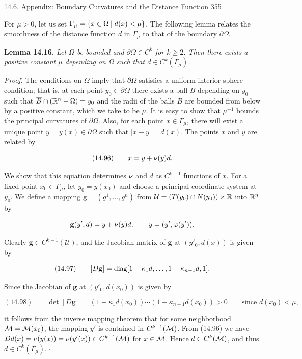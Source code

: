 
14.6. Appendix: Boundary Curvatures and the Distance Function \hfill 355

For $\mu>0$, let us set $\Gamma_{\mu}=\{x\in\Omega\mid d(x)<\mu\}$. The following lemma relates the smoothness of the distance function $d$ in $\Gamma_{\mu}$ to that of the boundary $\partial\Omega$.

\begin{lemma}\label{gt14-boundary-gradient-14-16}
\textbf{Lemma 14.16.} \textit{Let $\Omega$ be bounded and $\partial\Omega\in C^k$ for $k\ge 2$. Then there exists a positive constant $\mu$ depending on $\Omega$ such that $d\in C^k(\Gamma_{\mu})$.}

\textit{Proof.} The conditions on $\Omega$ imply that $\partial\Omega$ satisfies a uniform interior sphere condition; that is, at each point $y_0\in\partial\Omega$ there exists a ball $B$ depending on $y_0$ such that $\overline{B}\cap(\mathbb{R}^n-\Omega)=y_0$ and the radii of the balls $B$ are bounded from below by a positive constant, which we take to be $\mu$. It is easy to show that $\mu^{-1}$ bounds the principal curvatures of $\partial\Omega$. Also, for each point $x\in\Gamma_{\mu}$, there will exist a unique point $y=y(x)\in\partial\Omega$ such that $|x-y|=d(x)$. The points $x$ and $y$ are related by

\begin{equation}
(14.96)\qquad x=y+\nu(y)d.
\end{equation}

We show that this equation determines $\nu$ and $d$ as $C^{k-1}$ functions of $x$. For a fixed point $x_0\in\Gamma_{\mu}$, let $y_0=y(x_0)$ and choose a principal coordinate system at $y_0$. We define a mapping $\mathbf{g}=(g^1,\dots,g^n)$ from $\mathcal U=(T(y_0)\cap N(y_0))\times\mathbb{R}$ into $\mathbb{R}^n$ by

\[
\mathbf{g}(y',d)=y+\nu(y)d,\qquad y=(y',\varphi(y')).
\]

Clearly $\mathbf{g}\in C^{k-1}(\mathcal U)$, and the Jacobian matrix of $\mathbf{g}$ at $(y'_0,d(x))$ is given by

\begin{equation}
(14.97)\qquad [D\mathbf{g}]=\operatorname{diag}[1-\kappa_1 d,\dots,1-\kappa_{n-1}d,1].
\end{equation}

Since the Jacobian of $\mathbf{g}$ at $(y'_0,d(x_0))$ is given by

\begin{equation}
(14.98)\qquad \det [D\mathbf{g}]=(1-\kappa_1 d(x_0))\cdots(1-\kappa_{n-1} d(x_0))>0\qquad \text{since } d(x_0)<\mu,
\end{equation}

it follows from the inverse mapping theorem that for some neighborhood $\mathcal{M}=\mathcal{M}(x_0)$, the mapping $y'$ is contained in $C^{k-1}(\mathcal{M})$. From (14.96) we have $Dd(x)=\nu(y(x))=\nu(y'(x))\in C^{k-1}(\mathcal{M})$ for $x\in\mathcal{M}$. Hence $d\in C^k(\mathcal{M})$, and thus $d\in C^k(\Gamma_{\mu})$. $\square$
\end{lemma}

